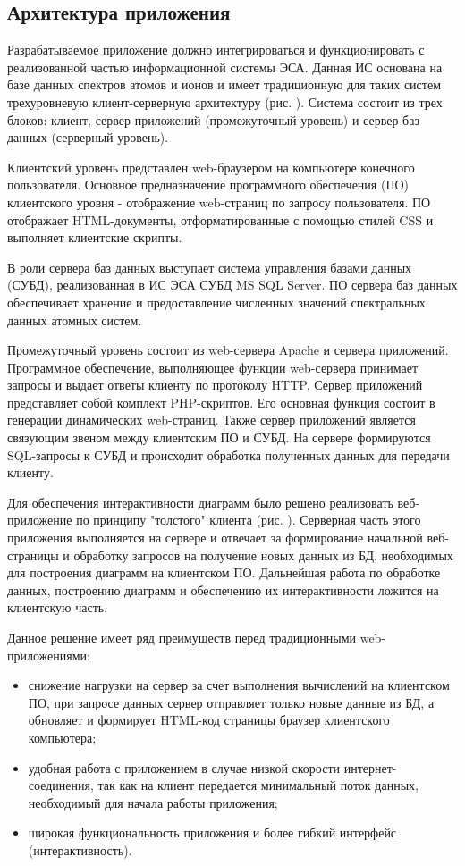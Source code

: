 \documentclass[a4paper, 12pt]{article}
\begin{document}
    \subsection{Архитектура приложения}
    Разрабатываемое приложение должно интегрироваться и функционировать с реализованной частью информационной системы ЭСА. Данная ИС основана на базе данных спектров атомов и ионов и имеет традиционную для таких систем трехуровневую клиент-серверную архитектуру (рис. ). Система состоит из трех блоков: клиент, сервер приложений (промежуточный уровень) и сервер баз данных (серверный уровень).\par
    Клиентский уровень представлен web-браузером на компьютере конечного пользователя. Основное предназначение программного обеспечения (ПО) клиентского уровня - отображение web-страниц по запросу пользователя. ПО отображает HTML-документы, отформатированные с помощью стилей CSS и выполняет клиентские скрипты.\par
    В роли сервера баз данных выступает система управления базами данных (СУБД), реализованная в ИС ЭСА СУБД MS SQL Server. ПО сервера баз данных обеспечивает хранение и предоставление численных значений спектральных данных атомных систем.\par
    Промежуточный уровень состоит из web-сервера Apache и сервера приложений. Программное обеспечение, выполняющее функции web-сервера принимает запросы и выдает ответы клиенту по протоколу HTTP. Сервер приложений представляет собой комплект PHP-скриптов. Его основная функция состоит в генерации динамических web-страниц. Также сервер приложений является связующим звеном между клиентским ПО и СУБД. На сервере формируются SQL-запросы к СУБД и происходит обработка полученных данных для передачи клиенту.\par
    Для обеспечения интерактивности диаграмм было решено реализовать веб-приложение по принципу "толстого" клиента (рис. ). Серверная часть этого приложения выполняется на сервере и отвечает за формирование начальной веб-страницы и обработку запросов на получение новых данных из БД, необходимых для построения диаграмм на клиентском ПО. Дальнейшая работа по обработке данных, построению диаграмм и обеспечению их интерактивности ложится на клиентскую часть.\par
    Данное решение имеет ряд преимуществ перед традиционными web-приложениями:
    \begin{itemize}
        \item снижение нагрузки на сервер за счет выполнения вычислений на клиентском ПО, при запросе данных сервер отправляет только новые данные из БД, а обновляет и формирует HTML-код страницы браузер клиентского компьютера;
        \item удобная работа с приложением в случае низкой скорости интернет-соединения, так как на клиент передается минимальный поток данных, необходимый для начала работы приложения;
        \item широкая функциональность приложения и более гибкий интерфейс (интерактивность).
    \end{itemize}
\end{document}

